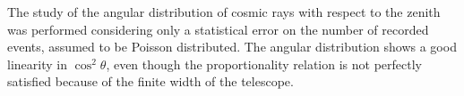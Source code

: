 \documentclass[a4paper]{article}
\begin{document}
The study of the angular distribution of cosmic rays with respect to the zenith was performed considering only a statistical error on the number of recorded events, assumed to be Poisson distributed. The angular distribution shows a good linearity in $\cos^2\theta$, even though the proportionality relation is not perfectly satisfied because of the finite width of the telescope.
\end{document}
